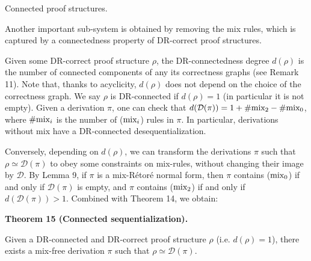  Connected proof structures.  
 
Another important sub-system is obtained by removing the mix rules, which is captured by a connectedness property of DR-correct proof structures.\par
 
 
 
Given some DR-correct proof structure $\rho$, the DR-connectedness degree $d(\rho)$ is the number of connected components of any its correctness graphs (see Remark 11). Note that, thanks to acyclicity, $d(\rho)$ does not depend on the choice of the correctness graph. We say $\rho$ is DR-connected if $d(\rho)=1$ (in particular it is not empty). Given a derivation $\pi$, one can check that $d(\mathcal{D}(\pi))=1+\#\textnormal{{mix}}_{2}-\#\textnormal{{mix}}_{0}$, where $\#\textnormal{{mix}}_{i}$ is the number of ($\textnormal{{mix}}_{i}$) rules in $\pi$. In particular, derivations without mix have a DR-connected desequentialization.\par
 
 
 
Conversely, depending on $d(\rho)$, we can transform the derivations $\pi$ such that $\rho\simeq\mathcal{D}(\pi)$ to obey some constraints on mix-rules, without changing their image by $\mathcal{D}$. By Lemma 9, if $\pi$ is a mix-Rétoré normal form, then $\pi$ contains ($\textnormal{{mix}}_{0}$) if and only if $\mathcal{D}(\pi)$ is empty, and $\pi$ contains ($\textnormal{{mix}}_{2}$) if and only if $d(\mathcal{D}(\pi))>1$. Combined with Theorem 14, we obtain:\par
 
   
 
 
\par\medskip\noindent\textbf{Theorem 15 (Connected sequentialization).}\par
 
 
Given a DR-connected and DR-correct proof structure $\rho$ (i.e. $d(\rho)=1$), there exists a mix-free derivation $\pi$ such that $\rho\simeq\mathcal{D}(\pi)$.\par
 
 
 
